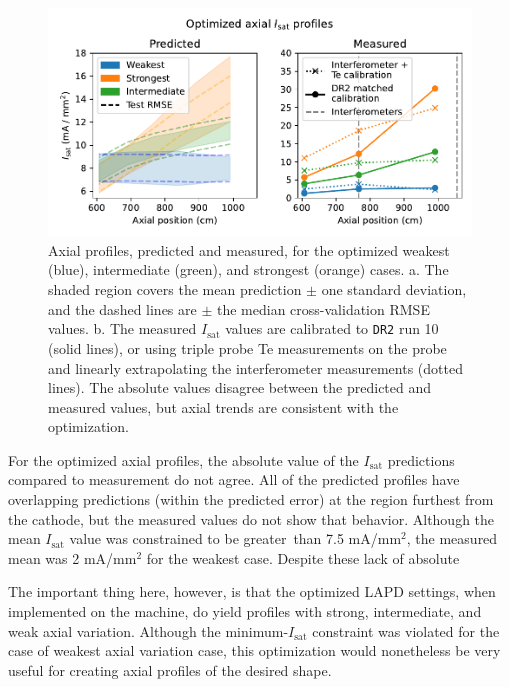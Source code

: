 \begin{figure}
	\centering
	\includegraphics[width=360pt]{figures/axial-var_prediction-vs-measurement_paper.pdf}
	\caption[size=12]{\label{fig:axial-var_prediction-vs-measurement}Axial profiles, predicted and measured, for the optimized weakest (blue), intermediate (green), and strongest (orange) cases. a. The shaded region covers the mean prediction $\pm$ one standard deviation, and the dashed lines are $\pm$ the median cross-validation RMSE values. b. The measured $I_\text{sat}$ values are calibrated to \texttt{DR2} run 10 (solid lines), or using triple probe Te measurements on the probe and linearly extrapolating the interferometer measurements (dotted lines). The absolute values disagree between the predicted and measured values, but axial trends are consistent with the optimization.}
\end{figure}

For the optimized axial profiles, the absolute value of the $I_\text{sat}$ predictions compared to measurement do not agree. All of the predicted profiles have overlapping predictions (within the predicted error) at the region furthest from the cathode, but the measured values do not show that behavior. Although the mean $I_\text{sat}$ value was constrained to be greater than 7.5 mA/mm$^2$, the measured mean was 2 mA/mm$^2$ for the weakest case. Despite these lack  of absolute 

The important thing here, however, is that the optimized LAPD settings, when implemented on the machine, do yield profiles with strong, intermediate, and weak axial variation. Although the minimum-$I_\text{sat}$ constraint was violated for the case of weakest axial variation case, this optimization would nonetheless be very useful for creating axial profiles of the desired shape. 

